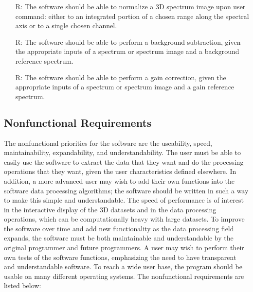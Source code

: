 \documentclass[12pt]{article}
\newcounter{reqnum} %
\begin{document}
\begin{itemize}
	\item[R\refstepcounter{reqnum}\thereqnum \label{R_normalization}:] The software should be able to normalize a 3D spectrum image upon user command: either to an integrated portion of a chosen range along the spectral axis or to a single chosen channel.
	
	\item[R\refstepcounter{reqnum}\thereqnum \label{R_background}:] The software should be able to perform a background subtraction, given the appropriate inputs of a spectrum or spectrum image and a background reference spectrum.
	
	\item[R\refstepcounter{reqnum}\thereqnum \label{R_gain}:] The software should be able to perform a gain correction, given the appropriate inputs of a spectrum or spectrum image and a gain reference spectrum.
\end{itemize}

\subsection{Nonfunctional Requirements}

The nonfunctional priorities for the software are the useability, speed, maintainability, expandability, and understandability. The user must be able to easily use the software to extract the data that they want and do the processing operations that they want, given the user characteristics defined elsewhere. In addition, a more advanced user may wish to add their own functions into the software data processing algorithms; the software should be written in such a way to make this simple and understandable. The speed of performance is of interest in the interactive display of the 3D datasets and in the data processing operations, which can be computationally heavy with large datasets. To improve the software over time and add new functionality as the data processing field expands, the software must be both maintainable and understandable by the original programmer and future programmers. A user may wish to perform their own tests of the software functions, emphasizing the need to have transparent and understandable software. To reach a wide user base, the program should be usable on many different operating systems. The nonfunctional requirements are listed below:
\end{document}
